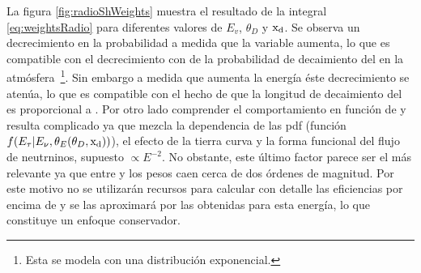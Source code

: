 	La figura \ref{fig:radioShWeights} muestra el resultado de la integral \ref{eq:weightsRadio} para diferentes valores de $E_v$, $\theta_D$ y ${\rm x_d}$.
	Se observa un decrecimiento en la probabilidad a medida que la variable \xd{} aumenta, lo que es compatible con el decrecimiento con \xd{} de la probabilidad de decaimiento del \tauon{} en la atm\'osfera~\footnote{Esta se modela con una distribuci\'on exponencial.}. 
	Sin embargo a medida que aumenta la energ\'ia \'este decrecimiento se aten\'ua, lo que es compatible con el hecho de que la longitud de decaimiento del \tauon{} es proporcional a \etau{}.
	Por otro lado comprender el comportamiento en funci\'on de \td{} y \ev{} resulta complicado ya que mezcla la dependencia de las pdf (funci\'on $f(E_\tau|E_\nu,\theta_E(\theta_D,{\rm x_d}))$), el efecto de la tierra curva y la forma funcional del flujo de neutrninos, supuesto $\propto E^{-2}$.
	No obstante, este \'ultimo factor parece ser el m\'as relevante ya que entre  y  los pesos caen cerca de dos \'ordenes de magnitud.
	Por este motivo no se utilizar\'an recursos para calcular con detalle las eficiencias por encima de  y se las aproximar\'a por las obtenidas para esta energ\'ia, lo que constituye un enfoque conservador. 
